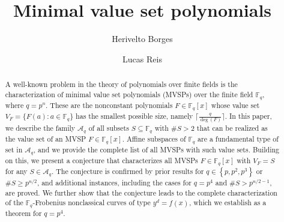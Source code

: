 \documentclass[11pt]{amsart}
\author{Herivelto Borges}
\author{Lucas Reis}
\newcommand{\F}{\mathbb{F}}
\theoremstyle{definition}
\theoremstyle{remark}
\begin{document}
\title{Minimal value set polynomials  } 
\begin{abstract}A well-known problem in the theory of polynomials over finite fields is the characterization of minimal value set polynomials (MVSPs) over the finite field $\mathbb{F}_q$, where $q = p^n$. These are the nonconstant polynomials $F \in \mathbb{F}_q[x]$ whose value set $V_F = \{F(a) : a \in \mathbb{F}_q\}$ has the smallest possible size, namely $\lceil \frac{q}{\deg(F)} \rceil$. 
In this paper, we describe the family $\mathcal{A}_q$ of all subsets $S \subseteq \mathbb{F}_q$ with $\# S>2$ that can be realized as the value set of an MVSP $F \in \mathbb{F}_q[x]$. Affine subspaces of $\mathbb{F}_q$ are a fundamental type of set in $\mathcal{A}_q$, and we provide the complete list of all MVSPs with such value sets. Building on this, we present a conjecture that characterizes all MVSPs $F \in \mathbb{F}_q[x]$ with $V_F=S$ for any $S \in \mathcal{A}_q$. The conjecture  is  confirmed by prior results for $q \in\left\{p, p^2, p^3\right\}$ or $\# S \geq p^{n / 2}$, and  additional instances, including the cases for $q=p^4$  and  $\# S>p^{n / 2-1}$, are proved. We further show  that the conjecture leads to the complete characterization
of the $\F_{q}$-Frobenius nonclassical curves of type $y^d=f(x)$,  which we establish as a theorem for $q=p^4$. 
\end{abstract}









\maketitle
\end{document}
